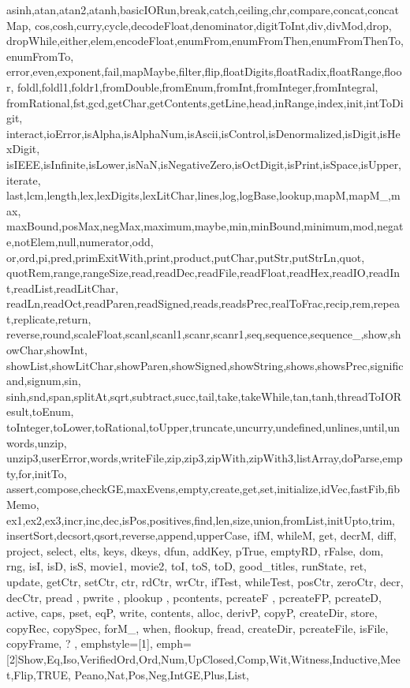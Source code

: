 {{		asinh,atan,atan2,atanh,basicIORun,break,catch,ceiling,chr,compare,concat,concatMap,
		cos,cosh,curry,cycle,decodeFloat,denominator,digitToInt,div,divMod,drop,
		dropWhile,either,elem,encodeFloat,enumFrom,enumFromThen,enumFromThenTo,enumFromTo,
		error,even,exponent,fail,mapMaybe,filter,flip,floatDigits,floatRadix,floatRange,floor,
		foldl,foldl1,foldr1,fromDouble,fromEnum,fromInt,fromInteger,fromIntegral,
		fromRational,fst,gcd,getChar,getContents,getLine,head,inRange,index,init,intToDigit,
		interact,ioError,isAlpha,isAlphaNum,isAscii,isControl,isDenormalized,isDigit,isHexDigit,
		isIEEE,isInfinite,isLower,isNaN,isNegativeZero,isOctDigit,isPrint,isSpace,isUpper,iterate,
		last,lcm,length,lex,lexDigits,lexLitChar,lines,log,logBase,lookup,mapM,mapM_,max,
		maxBound,posMax,negMax,maximum,maybe,min,minBound,minimum,mod,negate,notElem,null,numerator,odd,
		or,ord,pi,pred,primExitWith,print,product,putChar,putStr,putStrLn,quot,
		quotRem,range,rangeSize,read,readDec,readFile,readFloat,readHex,readIO,readInt,readList,readLitChar,
		readLn,readOct,readParen,readSigned,reads,readsPrec,realToFrac,recip,rem,repeat,replicate,return,
		reverse,round,scaleFloat,scanl,scanl1,scanr,scanr1,seq,sequence,sequence_,show,showChar,showInt,
		showList,showLitChar,showParen,showSigned,showString,shows,showsPrec,significand,signum,sin,
		sinh,snd,span,splitAt,sqrt,subtract,succ,tail,take,takeWhile,tan,tanh,threadToIOResult,toEnum,
		toInteger,toLower,toRational,toUpper,truncate,uncurry,undefined,unlines,until,unwords,unzip,
		unzip3,userError,words,writeFile,zip,zip3,zipWith,zipWith3,listArray,doParse,empty,for,initTo,
        assert,compose,checkGE,maxEvens,empty,create,get,set,initialize,idVec,fastFib,fibMemo,
        ex1,ex2,ex3,incr,inc,dec,isPos,positives,find,len,size,union,fromList,initUpto,trim,
        insertSort,decsort,qsort,reverse,append,upperCase, ifM, whileM, get, decrM, diff,
        project, select, elts, keys, dkeys, dfun, addKey, pTrue, emptyRD, rFalse,
        	dom, rng, isI, isD, isS, movie1, movie2,  toI, toS, toD, good_titles, runState, ret,
        	update, getCtr, setCtr, ctr, rdCtr, wrCtr, ifTest, whileTest, posCtr, zeroCtr, decr, decCtr,
        	pread , pwrite , plookup , pcontents, pcreateF , pcreateFP, pcreateD, active, caps, pset, eqP,
        	write, contents, alloc, derivP, copyP, createDir, store, copyRec, copySpec,
        	forM_, when, flookup, fread, createDir, pcreateFile, isFile, copyFrame, ?
	},
	emphstyle={[1]\color{haskellblue}},
	emph=
	{[2]Show,Eq,Iso,VerifiedOrd,Ord,Num,UpClosed,Comp,Wit,Witness,Inductive,Meet,Flip,TRUE,
	    Peano,Nat,Pos,Neg,IntGE,Plus,List,
}}
